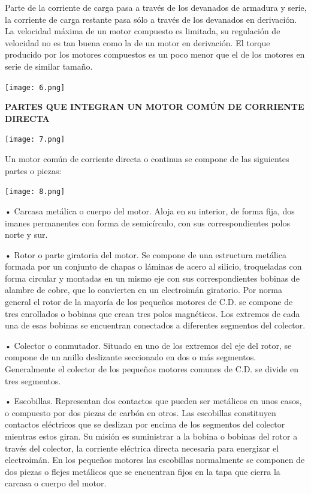 \documentclass[10pt,a4paper]{article}
\begin{document}
Parte de la corriente de carga pasa a través de los devanados de armadura y serie, la corriente de carga restante pasa sólo a través de los devanados en derivación. La velocidad máxima de un motor compuesto es limitada, su regulación de velocidad no es tan buena como la de un motor en derivación. El torque producido por los motores compuestos es un poco menor que el de los motores en serie de similar tamaño.\\

\begin{center}
\texttt{[image: 6.png]} 
\end{center}

\textbf{PARTES QUE INTEGRAN UN MOTOR COMÚN DE CORRIENTE DIRECTA}

\begin{center}
\texttt{[image: 7.png]} 
\end{center}

Un motor común de corriente directa o continua se compone de las siguientes partes o piezas:\\

\begin{center}
\texttt{[image: 8.png]} 
\end{center}

• Carcasa metálica o cuerpo del motor. Aloja en su interior, de forma fija, dos imanes permanentes con forma de semicírculo, con sus correspondientes polos norte y sur.


• Rotor o parte giratoria del motor. Se compone de una estructura metálica formada por un conjunto de chapas o láminas de acero al silicio, troqueladas con forma circular y montadas en un mismo eje con sus correspondientes bobinas de alambre de cobre, que lo convierten en un electroimán giratorio. Por norma general el rotor de la mayoría de los pequeños motores de C.D. se compone de tres enrollados o bobinas que crean tres polos magnéticos. Los extremos de cada una de esas bobinas se encuentran conectados a diferentes segmentos del colector.

• Colector o conmutador. Situado en uno de los extremos del eje del rotor, se compone de un anillo deslizante seccionado en dos o más segmentos. Generalmente el colector de los pequeños motores comunes de C.D. se divide en tres segmentos.

• Escobillas. Representan dos contactos que pueden ser metálicos en unos casos, o compuesto por dos piezas de carbón en otros. Las escobillas constituyen contactos eléctricos que se deslizan por encima de los segmentos del colector mientras estos giran. Su misión es suministrar a la bobina o bobinas del rotor a través del colector, la corriente eléctrica directa necesaria para energizar el electroimán. En los pequeños motores las escobillas normalmente se componen de dos piezas o flejes metálicos que se encuentran fijos en la tapa que cierra la carcasa o cuerpo del motor.\\
\end{document}
